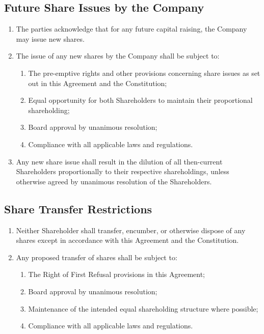 \subsection{Future Share Issues by the Company}
\begin{enumerate}[label=(\alph*)]
\item The parties acknowledge that for any future capital raising, the Company may issue new shares. 
\item The issue of any new shares by the Company shall be subject to:
    \begin{enumerate}[label=(\roman*)]
    \item The pre-emptive rights and other provisions concerning share issues as set out in this Agreement and the Constitution;
    \item Equal opportunity for both Shareholders to maintain their proportional shareholding;
    \item Board approval by unanimous resolution;
    \item Compliance with all applicable laws and regulations.
    \end{enumerate}
\item Any new share issue shall result in the dilution of all then-current Shareholders proportionally to their respective shareholdings, unless otherwise agreed by unanimous resolution of the Shareholders.
\end{enumerate}

\subsection{Share Transfer Restrictions}
\begin{enumerate}[label=(\alph*)]
\item Neither Shareholder shall transfer, encumber, or otherwise dispose of any shares except in accordance with this Agreement and the Constitution.
\item Any proposed transfer of shares shall be subject to:
    \begin{enumerate}[label=(\roman*)]
    \item The Right of First Refusal provisions in this Agreement;
    \item Board approval by unanimous resolution;
    \item Maintenance of the intended equal shareholding structure where possible;
    \item Compliance with all applicable laws and regulations.
    \end{enumerate}
\end{enumerate}

